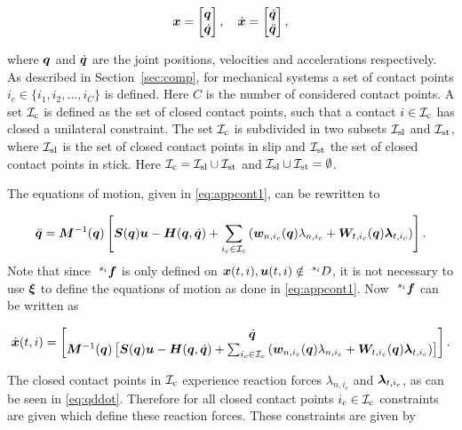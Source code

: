 \documentclass[../DC2017114Bouma.tex]{subfiles}
\begin{document}
\begin{align}
{\boldsymbol{x}} = \begin{bmatrix}
{\boldsymbol{q}}\\ \dot{{\boldsymbol{q}}}
\end{bmatrix},\quad
\dot{{\boldsymbol{x}}} = \begin{bmatrix}
\dot{{\boldsymbol{q}}}\\ \ddot{{\boldsymbol{q}}}
\end{bmatrix},
\end{align}

where ${\boldsymbol{q}}$ and $\dot{{\boldsymbol{q}}}$ are the joint positions, velocities and accelerations respectively. As described in Section~\ref{sec:comp}, for mechanical systems a set of contact points $i_c\in\{i_1,i_2,...,i_C\}$ is defined. Here $C$ is the number of considered contact points. A set $\mathcal{I}_\text{c}$ is defined as the set of closed contact points, such that a contact $i\in\mathcal{I}_\text{c}$ has closed a unilateral constraint. The set $\mathcal{I}_\text{c}$ is subdivided in two subsets $\mathcal{I}_{\text{sl}}$ and $\mathcal{I}_{\text{st}}$, where $\mathcal{I}_{\text{sl}}$ is the set of closed contact points in slip and $\mathcal{I}_{\text{st}}$ the set of closed contact points in stick. Here $\mathcal{I}_\text{c} =\mathcal{I}_{\text{sl}}\cup\mathcal{I}_{\text{st}}$ and $\mathcal{I}_{\text{sl}}\cup\mathcal{I}_{\text{st}}=\emptyset$. 

The equations of motion, given in \eqref{eq:appcont1}, can be rewritten to

\begin{align}
\ddot{{\boldsymbol{q}}} = {\boldsymbol{M}}^{-1}({\boldsymbol{q}})\left[ {\boldsymbol{S}}({\boldsymbol{q}}){\boldsymbol{u}} - {\boldsymbol{H}}({\boldsymbol{q}},\dot{{\boldsymbol{q}}}) + \sum_{i_c\in\mathcal{I}_c}\left({\boldsymbol{w}}_{n,i_c}({\boldsymbol{q}})\lambda_{n,i_c} + {\boldsymbol{W}}_{t,i_c}({\boldsymbol{q}})\boldsymbol{\lambda}_{t,i_c} \right)\right].\label{eq:qddot}
\end{align}
Note that since $\ ^{s_i}\fb$ is only defined on ${\boldsymbol{x}}(t,i),{\boldsymbol{u}}(t,i)\notin \ ^{s_i}D$, it is not necessary to use $\boldsymbol{\xi}$ to define the equations of motion as done in \eqref{eq:appcont1}. Now $\ ^{s_i}\fb$ can be written as

\begin{align}
\dot{{\boldsymbol{x}}}(t,i) =\begin{bmatrix}
\dot{{\boldsymbol{q}}}\\ {\boldsymbol{M}}^{-1}({\boldsymbol{q}})\left[ {\boldsymbol{S}}({\boldsymbol{q}}){\boldsymbol{u}} - {\boldsymbol{H}}({\boldsymbol{q}},\dot{{\boldsymbol{q}}}) + \sum_{i_c\in\mathcal{I}_c}\left({\boldsymbol{w}}_{n,i_c}({\boldsymbol{q}})\lambda_{n,i_c} + {\boldsymbol{W}}_{t,i_c}({\boldsymbol{q}})\boldsymbol{\lambda}_{t,i_c} \right)\right]
\end{bmatrix}.\label{eq:fcont}
\end{align}

The closed contact points in $\mathcal{I}_\text{c}$ experience reaction forces $\lambda_{n,i_c}$ and $\boldsymbol{\lambda}_{t,i_c}$, as can be seen in \eqref{eq:qddot}. Therefore for all closed contact points $i_c\in\mathcal{I}_\text{c}$ constraints are given which define these reaction forces. These constraints are given by
\end{document}
